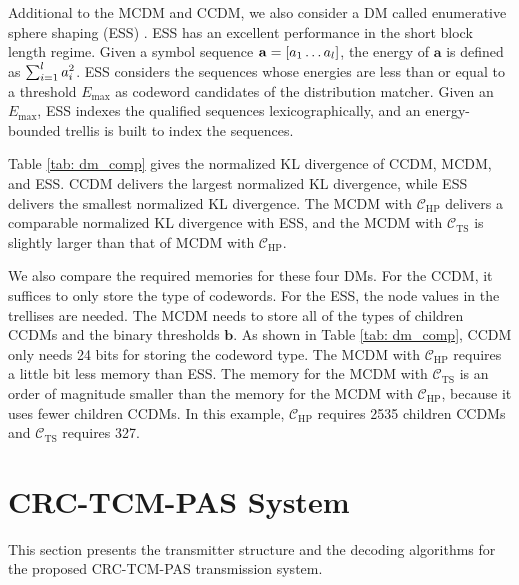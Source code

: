 \documentclass [PhD] {uclathes}
\begin{document}
Additional to the MCDM and CCDM, we also consider a DM called enumerative sphere shaping (ESS) \cite{amari2019ess}. ESS has an excellent performance in the short block length regime. Given a symbol sequence $\mathbf{a}=[a_1\ldots a_l]$, the energy of $\mathbf{a}$ is defined as $\sum_{i=1}^{l}a_i^2$. ESS considers the sequences whose energies are less than or equal to a threshold $E_{\text{max}}$ as codeword candidates of the distribution matcher. Given an $E_{\text{max}}$, ESS indexes the qualified sequences lexicographically, and an energy-bounded trellis is built to index the sequences. 

Table \ref{tab: dm_comp} gives the normalized KL divergence of CCDM, MCDM, and ESS. CCDM delivers the largest normalized KL divergence, while ESS delivers the smallest normalized KL divergence. The MCDM with $\mathcal{C}_{\mathrm{HP}}$ delivers a comparable normalized KL divergence with ESS, and the MCDM with $\mathcal{C}_{\mathrm{TS}}$ is slightly larger than that of MCDM with $\mathcal{C}_{\mathrm{HP}}$.



We also compare the required memories for these four DMs. For the CCDM, it suffices to only store the type of codewords. For the ESS, the node values in the trellises are needed\cite{amari2019ess}. The MCDM needs to store all of the types of children CCDMs and the binary thresholds $\mathbf{b}$. As shown in Table \ref{tab: dm_comp}, CCDM only needs 24 bits for storing the codeword type.  The MCDM with $\mathcal{C}_{\mathrm{HP}}$ requires a little bit less memory than ESS. The memory for the MCDM with $\mathcal{C}_{\mathrm{TS}}$ is an order of magnitude smaller than the memory for the MCDM with $\mathcal{C}_{\mathrm{HP}}$, because it uses fewer children CCDMs. In this example, $\mathcal{C}_{\mathrm{HP}}$ requires 2535 children CCDMs and $\mathcal{C}_{\mathrm{TS}}$ requires 327.

\section{CRC-TCM-PAS System}\label{sec: Prop}

This section presents the transmitter structure and the decoding algorithms for the proposed CRC-TCM-PAS transmission system.
\end{document}
